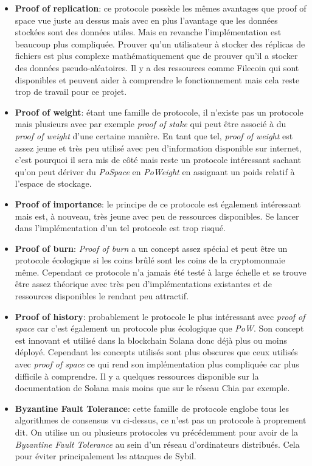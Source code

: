 \documentclass[../tb_report.tex]{subfiles}
\begin{document}
\begin{itemize}
    \item \textbf{Proof of replication}: ce protocole possède les mêmes avantages que proof of space vue juste au dessus mais avec en plus l'avantage que les données stockées sont des données utiles. Mais en revanche l'implémentation est beaucoup plus compliquée. Prouver qu'un utilisateur à stocker des réplicas de fichiers est plus complexe mathématiquement que de prouver qu'il a stocker des données pseudo-aléatoires. Il y a des ressources comme Filecoin qui sont disponibles et peuvent aider à comprendre le fonctionnement mais cela reste trop de travail pour ce projet.
    \item \textbf{Proof of weight}: étant une famille de protocole, il n'existe pas un protocole mais plusieurs avec par exemple \textit{proof of stake} qui peut être associé à du \textit{proof of weight} d'une certaine manière. En tant que tel, \textit{proof of weight} est assez jeune et très peu utilisé avec peu d'information disponible sur internet, c'est pourquoi il sera mis de côté mais reste un protocole intéressant sachant qu'on peut dériver du \textit{PoSpace} en \textit{PoWeight} en assignant un poids relatif à l'espace de stockage.
    \item \textbf{Proof of importance}: le principe de ce protocole est également intéressant mais est, à nouveau, très jeune avec peu de ressources disponibles. Se lancer dans l'implémentation d'un tel protocole est trop risqué.
    \item \textbf{Proof of burn}: \textit{Proof of burn} a un concept assez spécial et peut être un protocole écologique si les coins brûlé sont les coins de la cryptomonnaie même. Cependant ce protocole n'a jamais été testé à large échelle et se trouve être assez théorique avec très peu d'implémentations existantes et de ressources disponibles le rendant peu attractif.
    \item \textbf{Proof of history}: probablement le protocole le plus intéressant avec \textit{proof of space} car c'est également un protocole plus écologique que \textit{PoW}. Son concept est innovant et utilisé dans la blockchain Solana donc déjà plus ou moins déployé. Cependant les concepts utilisés sont plus obscures que ceux utilisés avec \textit{proof of space} ce qui rend son implémentation plus compliquée car plus difficile à comprendre. Il y a quelques ressources disponible sur la documentation de Solana mais moins que sur le réseau Chia par exemple.
    \item \textbf{Byzantine Fault Tolerance}: cette famille de protocole englobe tous les algorithmes de consensus vu ci-dessus, ce n'est pas un protocole à proprement dit. On utilise un ou plusieurs protocoles vu précédemment pour avoir de la \textit{Byzantine Fault Tolerance} au sein d'un réseau d'ordinateurs distribués. Cela pour éviter principalement les attaques de Sybil.
\end{itemize}
\end{document}
